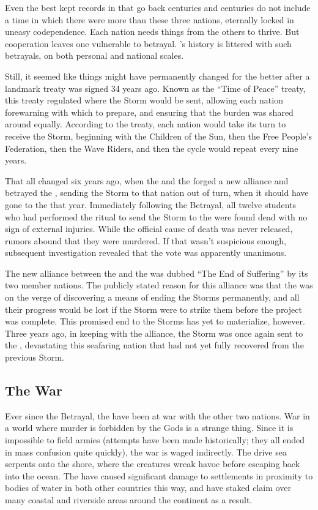 \documentclass[blue]{GL2020}
\begin{document}
Even the best kept records in \pEarth{} that go back centuries and centuries do not include a time in which there were more than these three nations, eternally locked in uneasy codependence. Each nation needs things from the others to thrive. But cooperation leaves one vulnerable to betrayal. \pEarth{}'s history is littered with such betrayals, on both personal and national scales.

Still, it seemed like things might have permanently changed for the better after a landmark treaty was signed 34 years ago. Known as the “Time of Peace” treaty, this treaty regulated where the Storm would be sent, allowing each nation forewarning with which to prepare, and ensuring that the burden was shared around equally. According to the treaty, each nation would take its turn to receive the Storm, beginning with the Children of the Sun, then the Free People’s Federation, then the Wave Riders, and then the cycle would repeat every nine years. 

That all changed six years ago, when the \pFarm{} and the \pTech{} forged a new alliance and betrayed the \pShippies{}, sending the Storm to that nation out of turn, when it should have gone to the \pTech{} that year. Immediately following the Betrayal, all twelve students who had performed the ritual to send the Storm to the \pShippies{} were found dead with no sign of external injuries. While the official cause of death was never released, rumors abound that they were murdered. If that wasn't suspicious enough, subsequent investigation revealed that the vote was apparently unanimous. 

The new alliance between the \pFarm{} and the \pTech{} was dubbed ``The End of Suffering'' by its two member nations. The publicly stated reason for this alliance was that the \pTech{} was on the verge of discovering a means of ending the Storms permanently, and all their progress would be lost if the Storm were to strike them before the project was complete. This promised end to the Storms has yet to materialize, however. Three years ago, in keeping with the alliance, the Storm was once again sent to the \pShippies{}, devastating this seafaring nation that had not yet fully recovered from the previous Storm.

\subsection*{The War}
Ever since the Betrayal, the \pShippies{} have been at war with the other two nations. War in a world where murder is forbidden by the Gods is a strange thing. Since it is impossible to field armies (attempts have been made historically; they all ended in mass confusion quite quickly), the war is waged indirectly. The \pShippies{} drive sea serpents onto the shore, where the creatures wreak havoc before escaping back into the ocean. The \pShippies{} have caused significant damage to settlements in proximity to bodies of water in both other countries this way, and have staked claim over many coastal and riverside areas around the continent as a result.
\end{document}
